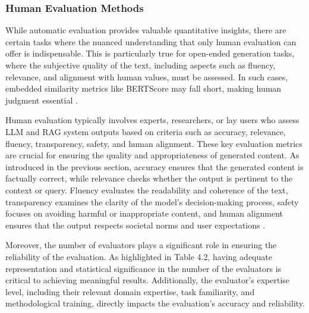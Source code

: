 \subsubsection{Human Evaluation Methods}

While automatic evaluation provides valuable quantitative insights, there are certain tasks where the nuanced understanding that only human evaluation can offer is indispensable. This is particularly true for open-ended generation tasks, where the subjective quality of the text, including aspects such as fluency, relevance, and alignment with human values, must be assessed. In such cases, embedded similarity metrics like BERTScore may fall short, making human judgment essential \cite{novikova2017we}.

Human evaluation typically involves experts, researchers, or lay users who assess LLM and RAG system outputs based on criteria such as accuracy, relevance, fluency, transparency, safety, and human alignment. These key evaluation metrics are crucial for ensuring the quality and appropriateness of generated content. As introduced in the previous section, accuracy ensures that the generated content is factually correct, while relevance checks whether the output is pertinent to the context or query. Fluency evaluates the readability and coherence of the text, transparency examines the clarity of the model’s decision-making process, safety focuses on avoiding harmful or inappropriate content, and human alignment ensures that the output respects societal norms and user expectations \cite{chang2024survey}.

Moreover, the number of evaluators plays a significant role in ensuring the reliability of the evaluation. As highlighted in Table 4.2, having adequate representation and statistical significance in the number of the evaluators is critical to achieving meaningful results. Additionally, the evaluator’s expertise level, including their relevant domain expertise, task familiarity, and methodological training, directly impacts the evaluation’s accuracy and reliability.

